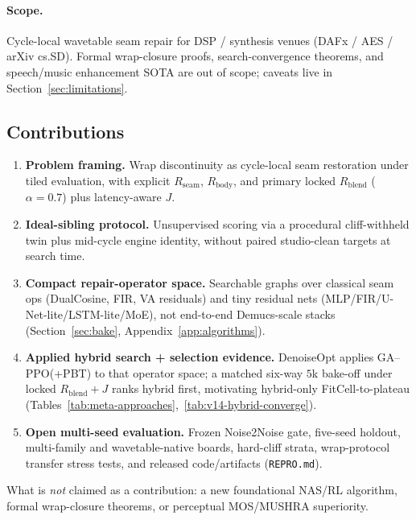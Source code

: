 \paragraph{Scope.}
Cycle-local wavetable seam repair for DSP / synthesis venues (DAFx / AES / arXiv cs.SD).
Formal wrap-closure proofs, search-convergence theorems, and speech/music enhancement SOTA are out of scope; caveats live in Section~\ref{sec:limitations}.

\subsection{Contributions}
\label{sec:contributions}
\begin{enumerate}
  \item \textbf{Problem framing.} Wrap discontinuity as cycle-local seam restoration under tiled evaluation, with explicit $R_{\mathrm{seam}}$, $R_{\mathrm{body}}$, and primary locked $R_{\mathrm{blend}}$ ($\alpha{=}0.7$) plus latency-aware $J$.
  \item \textbf{Ideal-sibling protocol.} Unsupervised scoring via a procedural cliff-withheld twin plus mid-cycle engine identity, without paired studio-clean targets at search time.
  \item \textbf{Compact repair-operator space.} Searchable graphs over classical seam ops (DualCosine, FIR, VA residuals) and tiny residual nets (MLP/FIR/U-Net-lite/LSTM-lite/MoE), not end-to-end Demucs-scale stacks (Section~\ref{sec:bake}, Appendix~\ref{app:algorithms}).
  \item \textbf{Applied hybrid search + selection evidence.} DenoiseOpt applies GA--PPO(+PBT) to that operator space; a matched six-way $5$k bake-off under locked $R_{\mathrm{blend}}{+}J$ ranks hybrid first, motivating hybrid-only FitCell-to-plateau (Tables~\ref{tab:meta-approaches},~\ref{tab:v14-hybrid-converge}).
  \item \textbf{Open multi-seed evaluation.} Frozen Noise2Noise gate, five-seed holdout, multi-family and wavetable-native boards, hard-cliff strata, wrap-protocol transfer stress tests, and released code/artifacts (\texttt{REPRO.md}).
\end{enumerate}
What is \emph{not} claimed as a contribution: a new foundational NAS/RL algorithm, formal wrap-closure theorems, or perceptual MOS/MUSHRA superiority.
